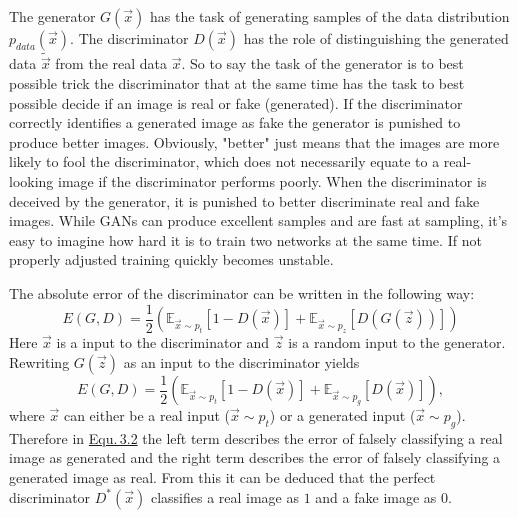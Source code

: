 The generator $G(\vec{x})$ has the task of generating samples of the data distribution $p_{data}(\vec{x})$. The discriminator $D(\vec{x})$ has the role of distinguishing the generated data $\tilde{\vec{x}}$ from the real data $\vec{x}$. So to say the task of the generator is to best possible trick the discriminator that at the same time has the task to best possible decide if an image is real or fake (generated). If the discriminator correctly identifies a generated image as fake the generator is punished to produce better images. Obviously, "better" just means that the images are more likely to fool the discriminator, which does not necessarily equate to a real-looking image if the discriminator performs poorly. When the discriminator is deceived by the generator, it is punished to better discriminate real and fake images. While GANs can produce excellent samples and are fast at sampling, it's easy to imagine how hard it is to train two networks at the same time. If not properly adjusted training quickly becomes unstable.

The absolute error of the discriminator can be written in the following way:
%
\begin{equation}
    E(G,D)=\frac{1}{2}\left(\mathbb{E}_{\vec{x}\sim p_{t}}[1-D(\vec{x})]+\mathbb{E}_{\vec{x}\sim p_{z}}[D(G(\vec{z}))]\right)
\end{equation}
%
Here $\vec{x}$ is a input to the discriminator and $\vec{z}$ is a random input to the generator. Rewriting $G(\vec{z})$ as an input to the discriminator yields
%
\begin{equation} \label{equ:3.2}
    E(G,D)=\frac{1}{2}\left(\mathbb{E}_{\vec{x}\sim p_{t}}[1-D(\vec{x})]+\mathbb{E}_{\vec{x}\sim p_{g}}[D(\vec{x})]\right),
\end{equation}
%
where $\vec{x}$ can either be a real input ($\vec{x}\sim p_t$) or a generated input ($\vec{x}\sim p_g$). Therefore in \hyperref[equ:3.2]{Equ.\,3.2} the left term describes the error of falsely classifying a real image as generated and the right term describes the error of falsely classifying a generated image as real. From this it can be deduced that the perfect discriminator $D^*(\vec{x})$ classifies a real image as $1$ and a fake image as $0$. 

